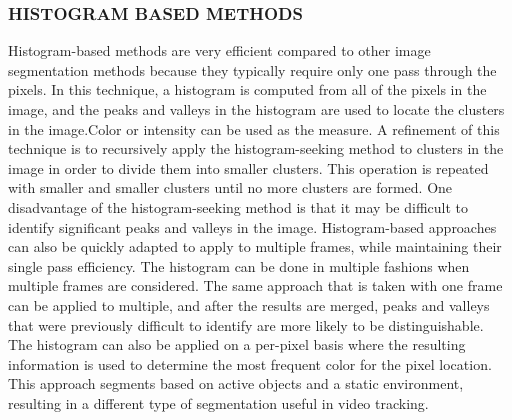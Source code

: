\subsubsection{HISTOGRAM BASED METHODS}
Histogram-based methods are very efficient compared to other image segmentation methods because they typically require only one pass through the pixels. In this technique, a histogram is computed from all of the pixels in the image, and the peaks and valleys in the histogram are used to locate the clusters in the image.Color or intensity can be used as the measure.
A refinement of this technique is to recursively apply the histogram-seeking method to clusters in the image in order to divide them into smaller clusters. This operation is repeated with smaller and smaller clusters until no more clusters are formed.
One disadvantage of the histogram-seeking method is that it may be difficult to identify significant peaks and valleys in the image.
Histogram-based approaches can also be quickly adapted to apply to multiple frames, while maintaining their single pass efficiency. The histogram can be done in multiple fashions when multiple frames are considered. The same approach that is taken with one frame can be applied to multiple, and after the results are merged, peaks and valleys that were previously difficult to identify are more likely to be distinguishable. The histogram can also be applied on a per-pixel basis where the resulting information is used to determine the most frequent color for the pixel location. This approach segments based on active objects and a static environment, resulting in a different type of segmentation useful in video tracking.

